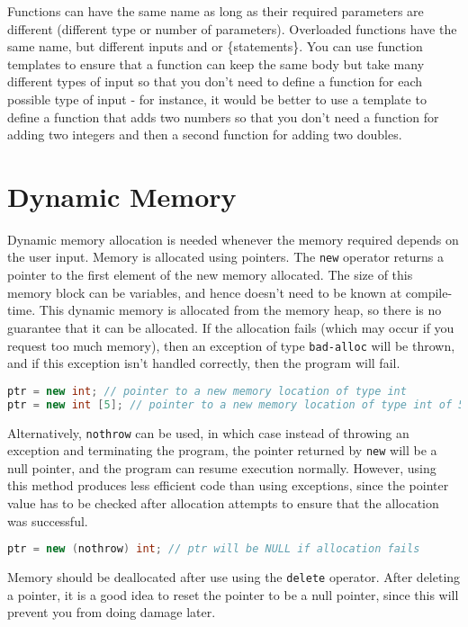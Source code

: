 \documentclass[10pt]{article}
\begin{document}
Functions can have the same name as long as their required parameters are different (different type or number of parameters). Overloaded functions have the same name, but different inputs and or \{statements\}. You can use function templates to ensure that a function can keep the same body but take many different types of input so that you don't need to define a function for each possible type of input - for instance, it would be better to use a template to define a function that adds two numbers so that you don't need a function for adding two integers and then a second function for adding two doubles. 

\section{Dynamic Memory}

Dynamic memory allocation is needed whenever the memory required depends on the user input. Memory is allocated using pointers. The \texttt{new} operator returns a pointer to the first element of the new memory allocated. The size of this memory block can be variables, and hence doesn't need to be known at compile-time. This dynamic memory is allocated from the memory heap, so there is no guarantee that it can be allocated. If the allocation fails (which may occur if you request too much memory), then an exception of type \texttt{bad-alloc} will be thrown, and if this exception isn't handled correctly, then the program will fail. 

\begin{lstlisting}[language=C++]
ptr = new int; // pointer to a new memory location of type int
ptr = new int [5]; // pointer to a new memory location of type int of 5 values
\end{lstlisting}

Alternatively, \texttt{nothrow} can be used, in which case instead of throwing an exception and terminating the program, the pointer returned by \texttt{new} will be a null pointer, and the program can resume execution normally. However, using this method produces less efficient code than using exceptions, since the pointer value has to be checked after allocation attempts to ensure that the allocation was successful. 

\begin{lstlisting}[language=C++]
ptr = new (nothrow) int; // ptr will be NULL if allocation fails
\end{lstlisting}

Memory should be deallocated after use using the \texttt{delete} operator. After deleting a pointer, it is a good idea to reset the pointer to be a null pointer, since this will prevent you from doing damage later.
\end{document}
